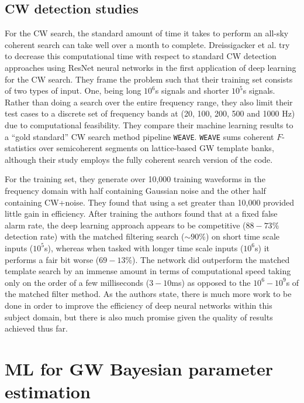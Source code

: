 %
%
\subsection{CW detection studies}

%

For the \ac{CW} search, the standard amount of time it takes to perform an all-sky coherent search can take well over a month to complete. Dreissigacker et al. try to decrease this computational time with respect to standard \ac{CW} detection approaches using ResNet neural networks in the first application of deep learning for the \ac{CW} search. They frame the problem such that their training set consists of two types of input. One, being long $10^6$s signals and shorter $10^5$s signals. Rather than doing a search over the entire frequency range, they also limit their test cases to a discrete set of frequency bands at (20, 100, 200, 500 and 1000 Hz) due to computational feasibility. They compare their machine learning results to a ``gold standard'' \ac{CW} search method pipeline \texttt{WEAVE}. \texttt{WEAVE} sums coherent $F$-statistics over semicoherent segments on lattice-based \ac{GW} template banks, although their study employs the fully coherent search version of the code. %

For the training set, they generate over 10,000 training waveforms in the frequency domain with half containing Gaussian noise and the other half containing \ac{CW}+noise. They found that using a set greater than 10,000 provided little gain in efficiency. After training the authors found that at a fixed false alarm rate, the deep learning approach appears to be competitive ($88 - 73\%$ detection rate) with the matched filtering search ($\sim90\%$) on short time scale inputs ($10^5$s), whereas when tasked with longer time scale inputs ($10^6$s) it performs a fair bit worse ($69-13\%$). The network did outperform the matched template search by an immense amount in terms of computational speed taking only on the order of a few milliseconds ($3 - 10$ms) as opposed to the $10^6 - 10^9$s of the matched filter method. As the authors state, there is much more work to be done in order to improve the efficiency of deep neural networks within this subject domain, but there is also much promise given the quality of results achieved thus far.

\section{ML for GW Bayesian parameter estimation}

